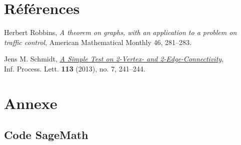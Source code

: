 \documentclass{article}      %
\begin{document}
\section{Références}
\begin{thebibliography}{9}
Herbert Robbins, \textit{A theorem on graphs, with an application to a problem on traffic control}, American Mathematical Monthly 46, 281–283.

Jens M. Schmidt, \href{https://arxiv.org/ftp/arxiv/papers/1209/1209.0700.pdf}{\underline{\textit{A Simple Test on 2-Vertex- and 2-Edge-Connectivity}}},
\\Inf. Process. Lett. \textbf{113} (2013), no. 7, 241–244.
\end{thebibliography}



\section{Annexe}
\subsection{Code SageMath}
\end{document}
